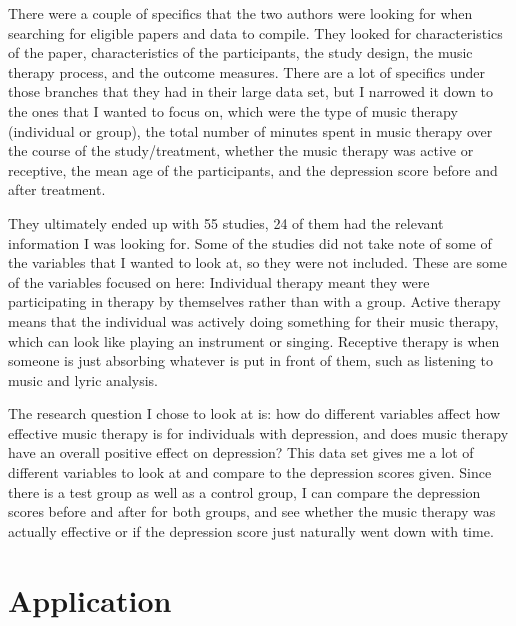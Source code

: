 \documentclass[12pt]{article}
\begin{document}
 There were a couple of specifics that the two authors were looking for when searching for eligible papers and data to compile. They looked for characteristics of the paper, characteristics of the participants, the study design, the music therapy process, and the outcome measures. There are a lot of specifics under those branches that they had in their large data set, but I narrowed it down to the ones that I wanted to focus on, which were the type of music therapy (individual or group), the total number of minutes spent in music therapy over the course of the study/treatment, whether the music therapy was active or receptive, the mean age of the participants, and the depression score before and after treatment. 
 
 They ultimately ended up with 55 studies, 24 of them had the relevant information I was looking for.  Some of the studies did not take note of some of the variables that I wanted to look at, so they were not included. These are some of the variables focused on here: Individual therapy meant they were participating in therapy by themselves rather than with a group. Active therapy means that the individual was actively doing something for their music therapy, which can look like playing an instrument or singing. Receptive therapy is when someone is just absorbing whatever is put in front of them, such as listening to music and lyric analysis. 
 
 The research question I chose to look at is: how do different variables affect how effective music therapy is for individuals with depression, and does music therapy have an overall positive effect on depression? This data set gives me a lot of different variables to look at and compare to the depression scores given. Since there is a test group as well as a control group, I can compare the depression scores before and after for both groups, and see whether the music therapy was actually effective or if the depression score just naturally went down with time.

 \newpage

 \section{Application} 
 \label{sec:application}
\end{document}
